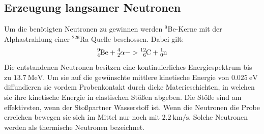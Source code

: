  \subsection{Erzeugung langsamer Neutronen}
 Um die benötigten Neutronen zu gewinnen werden $^9$Be-Kerne mit der Alphastrahlung einer $^{226}$Ra Quelle beschossen. Dabei gilt:
\begin{equation}
  \ce{^{9}_{4}Be} + \ce{^{4}_{2}\alpha} -> \ce{^{12}_{6}C} + \ce{^{1}_{0}n}
\end{equation}
 Die entstandenen Neutronen besitzen eine kontinuierliches Energiespektrum bis zu $\SI{13.7}{\mega\electronvolt}$. Um sie auf die gewünschte mittlere kinetische Energie von $\SI{0.025}{\electronvolt}$ diffundieren sie vordem Probenkontakt durch dicke Materieschichten, in welchen sie ihre kinetische Energie in elastischen Stößen abgeben. Die Stöße sind am effektivsten, wenn der Stoßpartner Wasserstoff ist. Wenn die Neutronen die Probe erreichen bewegen sie sich im Mittel nur noch mit $\SI{2.2}{\kilo\meter\per\second}$. Solche Neutronen werden als thermische Neutronen bezeichnet.
